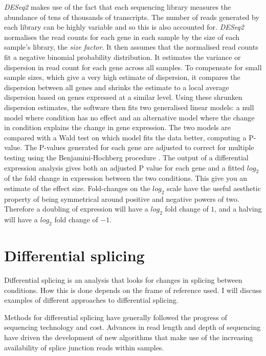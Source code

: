 \textit{DESeq2} makes use of the fact that each sequencing library measures the abundance of tens of thousands of transcripts. 
The number of reads generated by each library can be highly variable and so this is also accounted for. 
\textit{DESeq2} normalises the read counts for each gene in each sample by the size of each sample's library, the \textit{size factor}. 
It then assumes that the normalised read counts fit a negative binomial probability distribution. 
It estimates the variance or dispersion in read count for each gene across all samples. 
To compensate for small sample sizes, which give a very high estimate of dispersion, it compares the dispersion between all genes and shrinks the estimate to a local average dispersion based on genes expressed at a similar level. 
Using these shrunken dispersion estimates, the software then fits two generalised linear models: a null model where condition has no effect and an alternative model where the change in condition explains the change in gene expression. 
The two models are compared with a Wald test on which model fits the data better, computing a P-value. 
The P-values generated for each gene are adjusted to correct for multiple testing using the Benjamini-Hochberg procedure \citep{Benjamini1995}. 
The output of a differential expression analysis gives both an adjusted P value for each gene and a fitted $log_2$ of the fold change in expression between the two conditions. 
This give you an estimate of the effect size. 
Fold-changes on the $log_2$ scale have the useful aesthetic property of being symmetrical around positive and negative powers of two.
Therefore a doubling of expression will have a $log_2$ fold change of $1$, and a halving will have a $log_2$ fold change of $-1$.


\section{Differential splicing}

Differential splicing is an analysis that looks for changes in splicing between conditions. 
How this is done depends on the frame of reference used. 
I will discuss examples of different approaches to differential splicing.

Methods for differential splicing have generally followed the progress of sequencing technology and cost. 
Advances in read length and depth of sequencing have driven the development of new algorithms that make use of the increasing availability of splice junction reads within samples.


